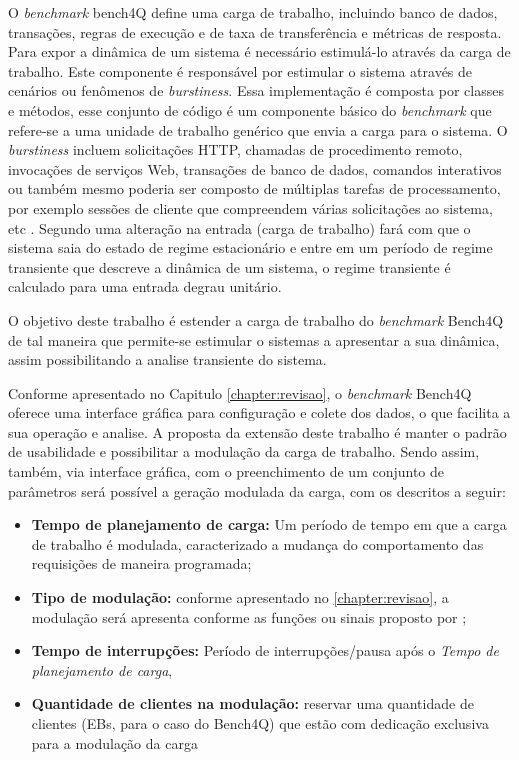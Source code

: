 O \textit{benchmark} bench4Q define uma carga de trabalho, incluindo banco de dados, transações, regras de execução e de taxa de transferência e métricas de resposta.  Para expor a dinâmica de um sistema é necessário estimulá-lo através da carga de trabalho. Este componente é responsável por estimular o sistema através de cenários ou fenômenos de \textit{burstiness}. Essa implementação é composta por classes e métodos, esse conjunto de código é um componente básico do \textit{benchmark} que refere-se a uma unidade de trabalho genérico que envia a carga para o sistema. O \textit{burstiness} incluem solicitações HTTP, chamadas de procedimento remoto, invocações de serviços Web, transações de banco de dados, comandos interativos ou também mesmo poderia ser composto de múltiplas tarefas de processamento, por exemplo sessões de cliente que compreendem várias solicitações ao sistema, etc \cite{Kounev2005}. Segundo  uma alteração na entrada (carga de trabalho) fará com que o sistema saia do estado de regime estacionário e entre em um período de regime transiente que descreve a dinâmica de um sistema, o regime transiente é calculado para uma entrada degrau unitário.

O objetivo deste trabalho é estender a carga de trabalho do \textit{benchmark} Bench4Q de tal maneira que permite-se estimular o sistemas a apresentar a sua dinâmica, assim possibilitando a analise transiente do sistema. 

Conforme apresentado no Capitulo \ref{chapter:revisao}, o \textit{benchmark} Bench4Q oferece uma interface gráfica para configuração e colete dos dados, o que facilita a sua operação e analise. A proposta da extensão deste trabalho é manter o padrão de usabilidade e possibilitar a modulação da carga de trabalho. Sendo assim, também, via interface gráfica, com o preenchimento de um conjunto de parâmetros será possível a geração modulada da carga, com os descritos a seguir:
\begin{itemize}
	\item \textbf{Tempo de planejamento de carga:} Um período de tempo em que a carga de trabalho é modulada, caracterizado a mudança do comportamento das requisições de maneira programada;
	\item \textbf{Tipo de modulação:} conforme apresentado no \ref{chapter:revisao}, a modulação será apresenta conforme as funções ou sinais proposto por ;
	\item \textbf{Tempo de interrupções:} Período de interrupções/pausa após o \textit{Tempo de planejamento de carga},
	\item \textbf{Quantidade de clientes na modulação:} reservar uma quantidade de clientes (EBs, para o caso do Bench4Q) que estão com dedicação exclusiva para a modulação da carga
\end{itemize}

